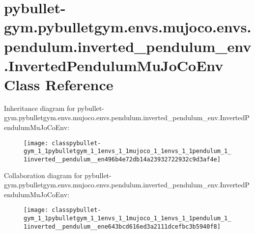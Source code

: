\hypertarget{classpybullet-gym_1_1pybulletgym_1_1envs_1_1mujoco_1_1envs_1_1pendulum_1_1inverted__pendulum__ene24fa0fbd77b386874ccd6320d672258}{}\section{pybullet-\/gym.pybulletgym.\+envs.\+mujoco.\+envs.\+pendulum.\+inverted\+\_\+pendulum\+\_\+env.\+Inverted\+Pendulum\+Mu\+Jo\+Co\+Env Class Reference}
\label{classpybullet-gym_1_1pybulletgym_1_1envs_1_1mujoco_1_1envs_1_1pendulum_1_1inverted__pendulum__ene24fa0fbd77b386874ccd6320d672258}


Inheritance diagram for pybullet-\/gym.pybulletgym.\+envs.\+mujoco.\+envs.\+pendulum.\+inverted\+\_\+pendulum\+\_\+env.\+Inverted\+Pendulum\+Mu\+Jo\+Co\+Env\+:
\nopagebreak
\begin{figure}[H]
\begin{center}
\leavevmode
\texttt{[image: classpybullet-gym\_1\_1pybulletgym\_1\_1envs\_1\_1mujoco\_1\_1envs\_1\_1pendulum\_1\_1inverted\_\_pendulum\_\_en496b4e72db14a23932722932c9d3af4e]}
\end{center}
\end{figure}


Collaboration diagram for pybullet-\/gym.pybulletgym.\+envs.\+mujoco.\+envs.\+pendulum.\+inverted\+\_\+pendulum\+\_\+env.\+Inverted\+Pendulum\+Mu\+Jo\+Co\+Env\+:
\nopagebreak
\begin{figure}[H]
\begin{center}
\leavevmode
\texttt{[image: classpybullet-gym\_1\_1pybulletgym\_1\_1envs\_1\_1mujoco\_1\_1envs\_1\_1pendulum\_1\_1inverted\_\_pendulum\_\_ene643bcd616ed3a2111dcefbc3b5940f8]}
\end{center}
\end{figure}
